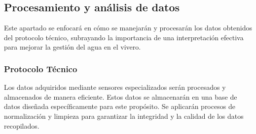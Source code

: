 \subsection{Procesamiento y análisis de datos}
Este apartado se enfocará en cómo se manejarán y procesarán los datos obtenidos
del protocolo técnico, subrayando la
importancia de una interpretación efectiva para mejorar la gestión del agua en
el vivero.

\subsubsection*{Protocolo Técnico}
Los datos adquiridos mediante sensores especializados serán procesados y almacenados de manera eficiente. Estos datos se almacenarán en una base de datos diseñada específicamente para este propósito. Se aplicarán procesos de normalización y limpieza para garantizar la integridad y la calidad de los datos recopilados.




